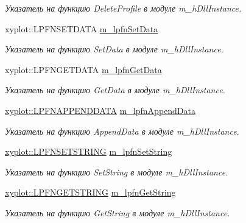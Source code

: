 \begin{DoxyCompactItemize}
\begin{DoxyCompactList}\small\item\em Указатель на функцию Delete\-Profile в модуле m\-\_\-h\-Dll\-Instance. \end{DoxyCompactList}\item 
xyplot\-::\-L\-P\-F\-N\-S\-E\-T\-D\-A\-T\-A \hyperlink{group__gr_func_pointers_ga12cbf5f4c39f57265eb98fa148e9150a}{m\-\_\-lpfn\-Set\-Data}
\begin{DoxyCompactList}\small\item\em Указатель на функцию Set\-Data в модуле m\-\_\-h\-Dll\-Instance. \end{DoxyCompactList}\item 
xyplot\-::\-L\-P\-F\-N\-G\-E\-T\-D\-A\-T\-A \hyperlink{group__gr_func_pointers_gaf08ccb9c45b77898ac5a5c024b7b6268}{m\-\_\-lpfn\-Get\-Data}
\begin{DoxyCompactList}\small\item\em Указатель на функцию Get\-Data в модуле m\-\_\-h\-Dll\-Instance. \end{DoxyCompactList}\item 
\hyperlink{namespacexyplot_a159121ca25d59ecb75770f0fbeea2515}{xyplot\-::\-L\-P\-F\-N\-A\-P\-P\-E\-N\-D\-D\-A\-T\-A} \hyperlink{group__gr_func_pointers_gab3dfb9dbb2d423d2e6b64fe0d0fcbb8e}{m\-\_\-lpfn\-Append\-Data}
\begin{DoxyCompactList}\small\item\em Указатель на функцию Append\-Data в модуле m\-\_\-h\-Dll\-Instance. \end{DoxyCompactList}\item 
\hyperlink{namespacexyplot_a9bb3deed6ff9723181f09eb590fdf7dd}{xyplot\-::\-L\-P\-F\-N\-S\-E\-T\-S\-T\-R\-I\-N\-G} \hyperlink{group__gr_func_pointers_ga94e766d64a4b9d8d435702a2244540b6}{m\-\_\-lpfn\-Set\-String}
\begin{DoxyCompactList}\small\item\em Указатель на функцию Set\-String в модуле m\-\_\-h\-Dll\-Instance. \end{DoxyCompactList}\item 
\hyperlink{namespacexyplot_ae11ea8cd7e895887b754555f31b0adf3}{xyplot\-::\-L\-P\-F\-N\-G\-E\-T\-S\-T\-R\-I\-N\-G} \hyperlink{group__gr_func_pointers_ga8fdef4b5c9b15682453368367ebb808a}{m\-\_\-lpfn\-Get\-String}
\begin{DoxyCompactList}\small\item\em Указатель на функцию Get\-String в модуле m\-\_\-h\-Dll\-Instance. \end{DoxyCompactList}\item 

\end{DoxyCompactItemize}
